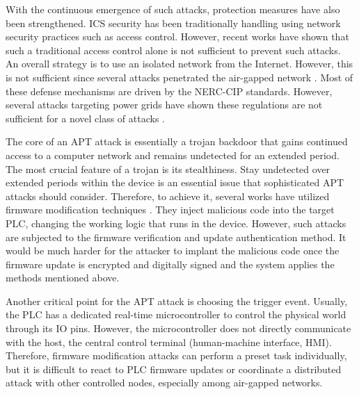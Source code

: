 
With the continuous emergence of such attacks, protection measures have also been strengthened. ICS security has been traditionally handling using network security practices such as access control. However, recent works have shown that such a traditional access control alone is not sufficient to prevent such attacks\cite{etigowni2016cpac}. An overall strategy is to use an isolated network from the Internet. However, this is not sufficient since several attacks penetrated the air-gapped network \cite{cherepanov2016blackenergy, langner2011stuxnet, di2018triton}. Most of these defense mechanisms are driven by the NERC-CIP standards. However, several attacks targeting power grids have shown these regulations are not sufficient for a novel class of attacks \cite{huang2018algorithmic,garcia2017hey}.  


The core of an APT attack is essentially a trojan backdoor that gains continued access to a computer network and remains undetected for an extended period. The most crucial feature of a trojan is its stealthiness. Stay undetected over extended periods within the device is an essential issue that sophisticated APT attacks should consider. Therefore, to achieve it, several works have utilized firmware modification techniques \cite{garcia2017hey, newman2011scada, basnight2013firmware, blanco2012one, cui2013firmware, konstantinou2015impact, schulz2017nexmon}. They inject malicious code into the target PLC, changing the working logic that runs in the device. However, such attacks are subjected to the firmware verification \cite{mcminn2012firmware, wang2015confirm, lee2016binding, li2011viper, seshadri2004swatt, li2010sbap} and update authentication \cite{lee2017blockchain, moran2019firmware, choi2016secure} method. It would be much harder for the attacker to implant the malicious code once the firmware update is encrypted and digitally signed and the system applies the methods mentioned above.

Another critical point for the APT attack is choosing the trigger event. Usually, the PLC has a dedicated real-time microcontroller to control the physical world through its IO pins. However, the microcontroller does not directly communicate with the host, the central control terminal (human-machine interface, HMI). Therefore, firmware modification attacks can perform a preset task individually, but it is difficult to react to PLC firmware updates or coordinate a distributed attack with other controlled nodes, especially among air-gapped networks.

